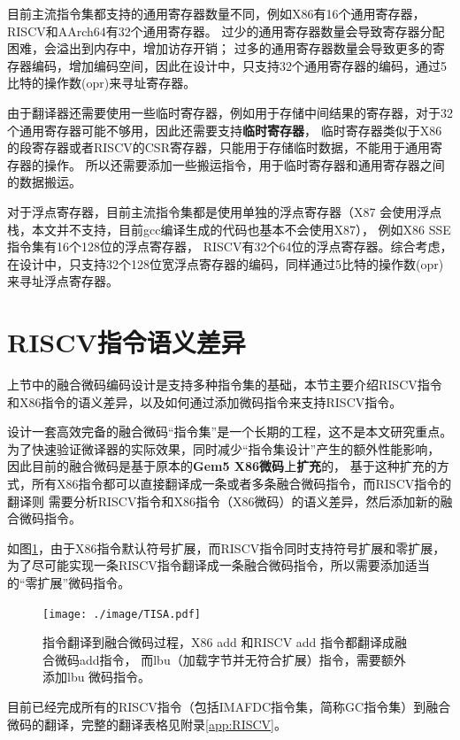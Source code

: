 目前主流指令集都支持的通用寄存器数量不同，例如X86有16个通用寄存器，RISCV和AArch64有32个通用寄存器。
过少的通用寄存器数量会导致寄存器分配困难，会溢出到内存中，增加访存开销；
过多的通用寄存器数量会导致更多的寄存器编码，增加编码空间，因此在设计中，只支持32个通用寄存器的编码，通过5比特的操作数(opr)来寻址寄存器。

由于翻译器还需要使用一些临时寄存器，例如用于存储中间结果的寄存器，对于32个通用寄存器可能不够用，因此还需要支持\textbf{临时寄存器}，
临时寄存器类似于X86的段寄存器或者RISCV的CSR寄存器，只能用于存储临时数据，不能用于通用寄存器的操作。
所以还需要添加一些搬运指令，用于临时寄存器和通用寄存器之间的数据搬运。

对于浮点寄存器，目前主流指令集都是使用单独的浮点寄存器（X87 会使用浮点栈，本文并不支持，目前gcc编译生成的代码也基本不会使用X87），
例如X86 SSE指令集有16个128位的浮点寄存器，
RISCV有32个64位的浮点寄存器。综合考虑，在设计中，只支持32个128位宽浮点寄存器的编码，同样通过5比特的操作数(opr)来寻址浮点寄存器。





\section{RISCV指令语义差异}

上节中的融合微码编码设计是支持多种指令集的基础，本节主要介绍RISCV指令和X86指令的语义差异，以及如何通过添加微码指令来支持RISCV指令。

设计一套高效完备的融合微码“指令集”是一个长期的工程，这不是本文研究重点。
为了快速验证微译器的实际效果，同时减少“指令集设计”产生的额外性能影响，
因此目前的融合微码是基于原本的\textbf{Gem5 X86微码}上\textbf{扩充}的，
基于这种扩充的方式，所有X86指令都可以直接翻译成一条或者多条融合微码指令，而RISCV指令的翻译则
需要分析RISCV指令和X86指令（X86微码）的语义差异，然后添加新的融合微码指令。

如图\ref{img:TISA}，由于X86指令默认符号扩展，而RISCV指令同时支持符号扩展和零扩展，
为了尽可能实现一条RISCV指令翻译成一条融合微码指令，所以需要添加适当的“零扩展”微码指令。

\begin{figure}[!htbp]
  \centering
  \texttt{[image: ./image/TISA.pdf]}
  \caption{指令翻译到融合微码过程，X86 add 和RISCV add 指令都翻译成融合微码add指令，
  而lbu（加载字节并无符合扩展）指令，需要额外添加lbu 微码指令。}
  \label{img:TISA}
\end{figure}



目前已经完成所有的RISCV指令（包括IMAFDC指令集，简称GC指令集）到融合微码的翻译，完整的翻译表格见附录\ref{app:RISCV}。

